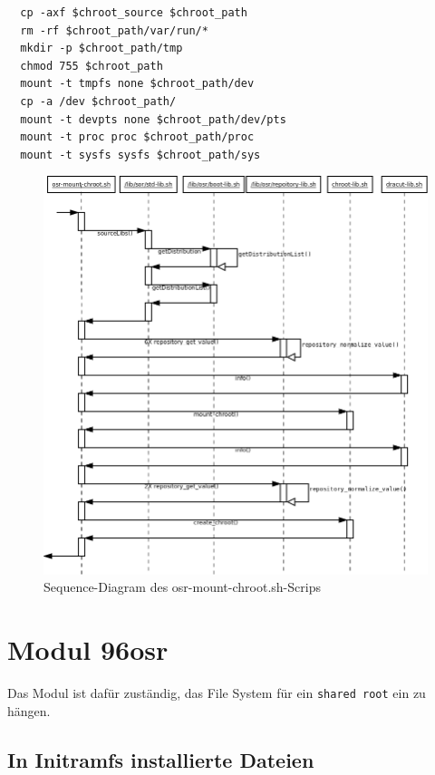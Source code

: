 \documentclass[10pt,a4paper]{article}
\begin{document}
\begin{verbatim}
  cp -axf $chroot_source $chroot_path
  rm -rf $chroot_path/var/run/*
  mkdir -p $chroot_path/tmp
  chmod 755 $chroot_path
  mount -t tmpfs none $chroot_path/dev
  cp -a /dev $chroot_path/
  mount -t devpts none $chroot_path/dev/pts
  mount -t proc proc $chroot_path/proc
  mount -t sysfs sysfs $chroot_path/sys
\end{verbatim}

\begin{figure}[H]
 \centering
 \includegraphics[scale=0.25]{./sequence_diagram_osr-mount-chroot_DE_de.png}
 \caption[]{Sequence-Diagram des osr-mount-chroot.sh-Scrips}
\end{figure}



\section{Modul 96osr}

Das Modul ist dafür zuständig, das File System für ein \texttt{shared root} ein zu hängen.

\subsection{In Initramfs installierte Dateien}
\end{document}
